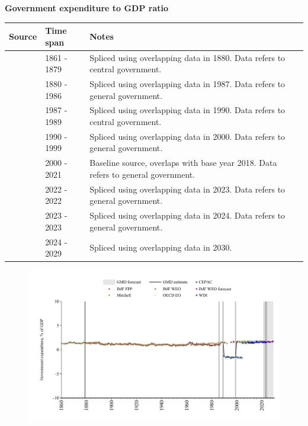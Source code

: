 \documentclass[12pt,a4paper,landscape]{article}
\begin{document}
\begin{adjustbox}{max totalsize={\paperwidth}{\paperheight},center}
\begin{minipage}[t][\textheight][t]{\textwidth}
\vspace*{0.5cm}
{}
\begin{center}
{\Large\bfseries Government expenditure to GDP ratio}
\end{center}
\vspace{0.5cm}
\begin{table}[H]
\centering
\small
\begin{tabular}{|l|l|l|}
\hline
\textbf{Source} & \textbf{Time span} & \textbf{Notes} \\
\hline
\rowcolor{white}\cite{Mitchell}& 1861 - 1879 &Spliced using overlapping data in 1880. Data refers to central government.\\
\rowcolor{lightgray}\cite{IMF_FPP}& 1880 - 1986 &Spliced using overlapping data in 1987. Data refers to general government.\\
\rowcolor{white}\cite{Mitchell}& 1987 - 1989 &Spliced using overlapping data in 1990. Data refers to central government.\\
\rowcolor{lightgray}\cite{CEPAC}& 1990 - 1999 &Spliced using overlapping data in 2000. Data refers to general government.\\
\rowcolor{white}\cite{OECD_EO}& 2000 - 2021 &Baseline source, overlaps with base year 2018. Data refers to general government.\\
\rowcolor{lightgray}\cite{IMF_WEO}& 2022 - 2022 &Spliced using overlapping data in 2023. Data refers to general government.\\
\rowcolor{white}\cite{WDI}& 2023 - 2023 &Spliced using overlapping data in 2024. Data refers to general government.\\
\rowcolor{lightgray}\cite{IMF_WEO_forecast}& 2024 - 2029 &Spliced using overlapping data in 2030. \\
\hline
\end{tabular}
\end{table}
\begin{figure}[H]
\centering
\includegraphics[width=\textwidth,height=0.6\textheight,keepaspectratio]{graphs/BRA_govexp_GDP.pdf}
\end{figure}
\end{minipage}
\end{adjustbox}
\end{document}
